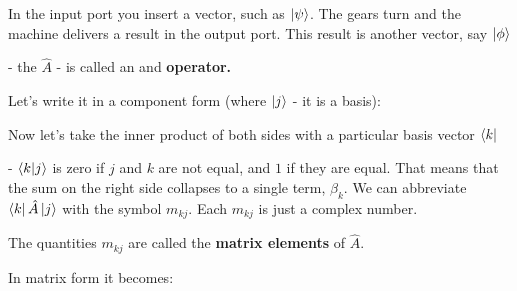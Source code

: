 \documentclass{article}
\begin{document}
In the input port you insert a vector, such as $\ket{\psi}$. The gears turn and the machine delivers a result in the output port. This result is another vector, say $\ket{\phi}$


- the $\hat{A}$  - is called an and \textbf{operator.}


Let's write it in a component form (where $\ket{j}$ - it is a basis):




Now let's take the inner product of both sides with a particular basis vector $\bra{k}$



- $\bra{k}\ket{j}$ is zero if $j$ and $k$ are not equal, and $1$ if they are equal.
That means that the sum on the right side collapses to a single term, $\beta_k$. We can abbreviate $\bra{k} \hat{A} \ket{j}$ with the symbol $m_{kj}$. Each $m_{kj}$ is just a complex number.

The quantities $m_{kj}$ are called the \textbf{matrix elements} of $\hat{A}$.


In matrix form it becomes:

\end{document}
